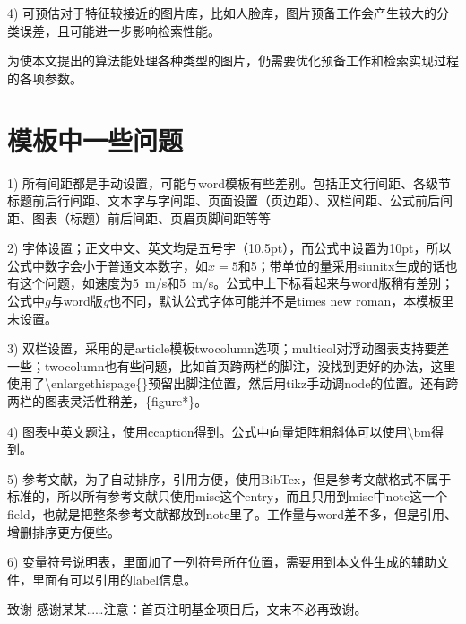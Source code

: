 \documentclass[10.5pt,twocolumn]{jbuaa}
\newcommand\mycolorRed[1]{{\color{red}#1}}
\begin{document}
4) 可预估对于特征较接近的图片库，比如人脸库，图片预备工作会产生较大的分类误差，且可能进一步影响检索性能。

为使本文提出的算法能处理各种类型的图片，仍需要优化预备工作和检索实现过程的各项参数。


\section{\mycolorRed{模板中一些问题}}

1) 所有\mycolorRed{间距}都是手动设置，可能与word模板有些差别。包括正文行间距、各级节标题前后行间距、文本字与字间距、页面设置（页边距）、双栏间距、公式前后间距、图表（标题）前后间距、页眉页脚间距等等

2) \mycolorRed{字体}设置；正文中文、英文均是五号字（10.5pt），而公式中设置为10pt，所以公式中数字会小于普通文本数字，如$x=5$和5；带单位的量采用siunitx生成的话也有这个问题，如速度为\SI{5}{m/s}和5\ m/s。公式中上下标看起来与word版稍有差别；公式中$g$与word版\textit{g}也不同，默认公式字体可能并不是times new roman，本模板里未设置。

3) \mycolorRed{双栏}设置，采用的是article模板twocolumn选项；multicol对浮动图表支持要差一些；twocolumn也有些问题，比如首页跨两栏的脚注，没找到更好的办法，这里使用了\textbackslash enlargethispage\{\}预留出脚注位置，然后用tikz手动调node的位置。还有跨两栏的图表灵活性稍差，\{figure*\}。

4) 图表中英文题注，使用ccaption得到。公式中向量矩阵粗斜体可以使用\textbackslash bm得到。

5) 参考文献，为了自动排序，引用方便，使用BibTex，但是参考文献格式不属于标准的，所以所有参考文献只使用misc这个entry，而且只用到misc中note这一个field，也就是把整条参考文献都放到note里了。工作量与word差不多，但是引用、增删排序更方便些。

6) 变量符号说明表，里面加了一列符号所在位置，需要用到本文件生成的辅助文件，里面有可以引用的label信息。


\vspace{1em}
{\hei\wuhao 致谢\quad}
{\fang\wuhao 
感谢某某……注意：首页注明基金项目后，文末不必再致谢。
}




\renewcommand\refname{\hei\wuhao\centerline{参考文献（References）}\global\def\refname{参考文献}}
\vskip 12pt

\let\OLDthebibliography\thebibliography
\renewcommand\thebibliography[1]{
  \OLDthebibliography{#1}
  \setlength{\parskip}{0pt}
  \setlength{\itemsep}{0pt plus 0.3ex}
}
\end{document}
